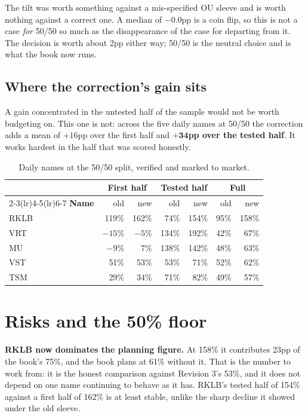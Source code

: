 \documentclass[11pt]{article}
\begin{document}
The tilt was worth something against a mis-specified OU sleeve and is worth nothing against a
correct one. A median of $-0.0$pp is a coin flip, so this is not a case \emph{for} 50/50 so much
as the disappearance of the case for departing from it. The decision is worth about 2pp either
way; 50/50 is the neutral choice and is what the book now runs.

\subsection{Where the correction's gain sits}

A gain concentrated in the untested half of the sample would not be worth budgeting on. This one
is not: across the five daily names at 50/50 the correction adds a mean of $+16$pp over the first
half and $\mathbf{+34}$\textbf{pp over the tested half}. It works hardest in the half that was
scored honestly.

\begin{table}[H]\centering\small
\begin{tabular}{lrrrrrr}
\toprule
& \multicolumn{2}{c}{\textbf{First half}} & \multicolumn{2}{c}{\textbf{Tested half}} &
\multicolumn{2}{c}{\textbf{Full}}\\
\cmidrule(lr){2-3}\cmidrule(lr){4-5}\cmidrule(lr){6-7}
\textbf{Name} & old & new & old & new & old & new\\
\midrule
\rowcolor{bckeep} RKLB & 119\% & 162\% & 74\%  & 154\% & 95\% & 158\%\\
VRT  & $-15$\% & $-5$\% & 134\% & 192\% & 42\% & 67\%\\
\rowcolor{bckeep} MU   & $-9$\%  & 7\%   & 138\% & 142\% & 48\% & 63\%\\
VST  & 51\%  & 53\%  & 53\%  & 71\%  & 52\% & 62\%\\
\rowcolor{bckeep} TSM  & 29\%  & 34\%  & 71\%  & 82\%  & 49\% & 57\%\\
\bottomrule
\end{tabular}
\caption{Daily names at the 50/50 split, verified and marked to market.}
\end{table}

\section{Risks and the 50\% floor}

\textbf{RKLB now dominates the planning figure.} At 158\% it contributes 23pp of the book's
75\%, and the book plans at 61\% without it. That is the number to work from: it is the honest
comparison against Revision 3's 53\%, and it does not depend on one name continuing to behave as
it has. RKLB's tested half of 154\% against a first half of 162\% is at least stable, unlike the
sharp decline it showed under the old sleeve.
\end{document}
